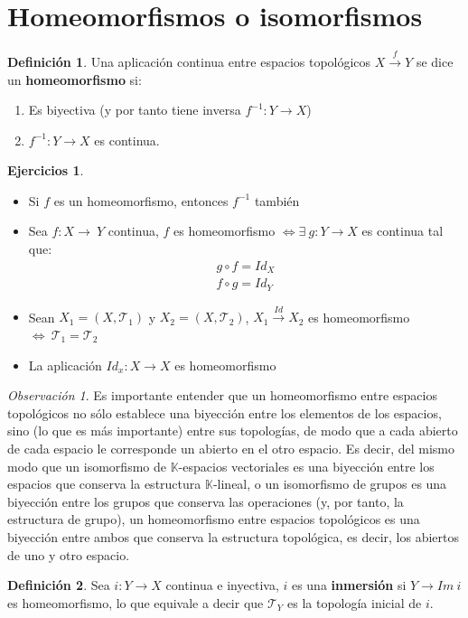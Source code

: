 \documentclass[12pt,twoside]{report}
\newcommand\mc[1]{\mathcal{#1}}
\theoremstyle{azul}
\theoremstyle{azul2}
\theoremstyle{plain}
\theoremstyle{definition}
\newtheorem*{defi}{Definición}
\newtheorem*{ejers}{Ejercicios}
\theoremstyle{remark}
\newtheorem*{obs}{Observación}
\begin{document}
\section{Homeomorfismos o isomorfismos}
\begin{defi}
Una aplicación continua entre espacios topológicos $X \stackrel{f}{\longrightarrow} Y$ se dice un \textbf{homeomorfismo} si: \vspace{-2mm}
\begin{enumerate}
    \item Es biyectiva (y por tanto tiene inversa $f^{-1}: Y \longrightarrow X$)
    \item $f^{-1}: Y \longrightarrow X$ es continua.
\end{enumerate}
\end{defi}
\begin{ejers}\:\vspace{-5mm}
\begin{itemize}
    \item Si $f$ es un homeomorfismo, entonces $f^{-1}$ tambi{\'e}n
    \item Sea $f:X {\longrightarrow} \: Y$ continua, $f$ es homeomorfismo $\Longleftrightarrow \exists \: g : Y{\longrightarrow}X$ es continua tal que: 
    $$\begin{array}{c}
     g \circ f = Id_X  \\
     f \circ g = Id_Y
\end{array}$$
 \item Sean $X_1=(X,\mc{T}_1)$ y $X_2=(X,\mc{T}_2)$, $X_1 \stackrel{Id}{\longrightarrow} X_2$ es homeomorfismo $\Longleftrightarrow \: \mc{T}_1=\mc{T}_2$
 \item La aplicación $Id_x: X \longrightarrow X$ es homeomorfismo
\end{itemize}
\end{ejers}
\begin{obs}
\quad Es importante entender que un homeomorfismo entre espacios topológicos no sólo
establece una biyección entre los elementos de los espacios, sino (lo que es más importante)
entre sus topologías, de modo que a cada abierto de cada espacio le corresponde un abierto
en el otro espacio. Es decir, del mismo modo que un isomorfismo de $\mathbb{K}$-espacios vectoriales
es una biyección entre los espacios que conserva la estructura $\mathbb{K}$-lineal, o un isomorfismo
de grupos es una biyección entre los grupos que conserva las operaciones (y, por tanto, la
estructura de grupo), un homeomorfismo entre espacios topológicos es una biyección entre
ambos que conserva la estructura topológica, es decir, los abiertos de uno y otro espacio.
\end{obs}
\begin{defi}
Sea $i: Y \longrightarrow X$ continua e inyectiva, $i$ es una \textbf{inmersión} si $Y \longrightarrow Im \: i$ es homeomorfismo, lo que equivale a decir que $\mc{T}_Y$ es la topología inicial de $i$.
\end{defi}
\end{document}
